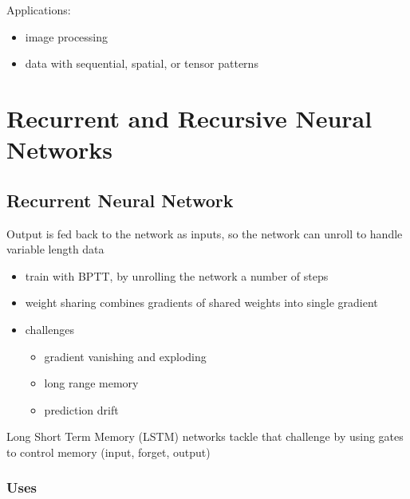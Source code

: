 \documentclass[]{article}
\theoremstyle{definition}
\begin{document}
Applications:
\begin{itemize}
    \item image processing
    \item data with sequential, spatial, or tensor patterns
\end{itemize}

\section{Recurrent and Recursive Neural Networks}
\label{sec:recurrent_and_recursive_neural_networks}

\subsection{Recurrent Neural Network}
\label{sub:recurrent_neural_network}

Output is fed back to the network as inputs, so the network can unroll to handle variable length data

\begin{itemize}
    \item train with BPTT, by unrolling the network a number of steps
    \item weight sharing combines gradients of shared weights into single gradient
    \item challenges
        \begin{itemize}
            \item gradient vanishing and exploding
            \item long range memory
            \item prediction drift
        \end{itemize}
\end{itemize}

Long Short Term Memory (LSTM) networks tackle that challenge by using gates to control memory (input, forget, output)

\subsubsection{Uses}
\label{ssub:Uses}
\end{document}
